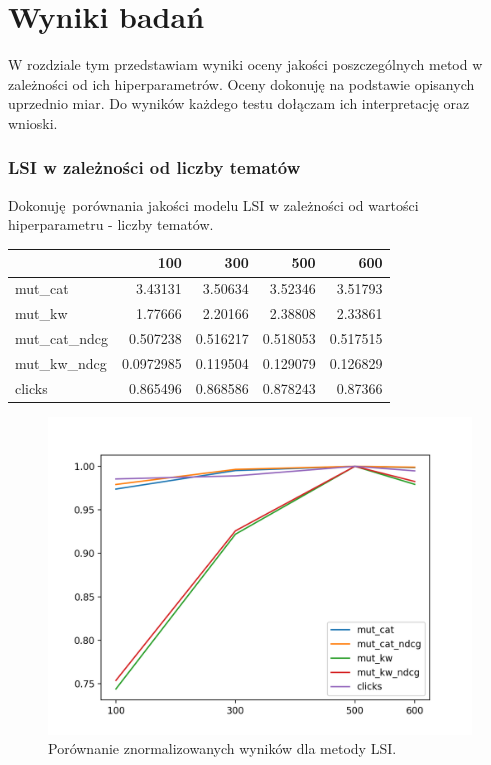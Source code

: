 \documentclass[pl]{minipw} %
\begin{document}
\chapter{Wyniki badań}
W rozdziale tym przedstawiam wyniki oceny jakości poszczególnych metod w zależności od ich hiperparametrów. Oceny dokonuję na podstawie opisanych uprzednio miar. Do wyników każdego testu dołączam ich interpretację oraz wnioski.

\subsection{LSI w zależności od liczby tematów}

Dokonuję porównania jakości modelu LSI w zależności od wartości hiperparametru - liczby tematów.

\begin{center}
	\begin{tabular}{lrrrr}
		\hline
		&       100 &      300 &      500 &      600 \\
		\hline
		mut\_cat      & 3.43131   & 3.50634  & 3.52346  & 3.51793  \\
		mut\_kw       & 1.77666   & 2.20166  & 2.38808  & 2.33861  \\
		mut\_cat\_ndcg & 0.507238  & 0.516217 & 0.518053 & 0.517515 \\
		mut\_kw\_ndcg  & 0.0972985 & 0.119504 & 0.129079 & 0.126829 \\
		clicks       & 0.865496  & 0.868586 & 0.878243 & 0.87366  \\
		\hline
	\end{tabular}
\end{center}

\begin{figure}[H]
	\centering
	\includegraphics[width=1\textwidth]{img/results/lsi.png}
	\caption{Porównanie znormalizowanych wyników dla metody LSI.}
\end{figure}
\end{document}

